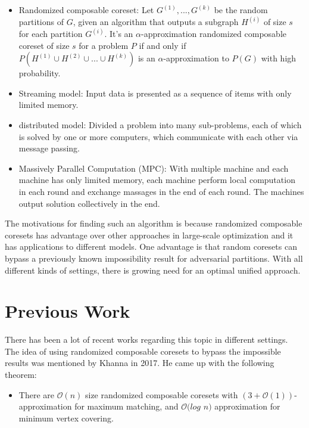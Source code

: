 \documentclass[12pt]{report}
\begin{document}
{\begin{itemize}
    \item Randomized composable coreset: Let $G^{(1)} ,...,G^{(k)}$ be the random partitions of $G$, given an algorithm that outputs a subgraph $H^{(i)}$ of size $s$ for each partition $G^{(i)}$. It's an $\alpha$-approximation randomized composable coreset of size $s$ for a problem $P$ if and only if $P(H^{(1)} \cup H^{(2)} \cup ... \cup H^{(k)} )$ is an $\alpha$-approximation to $P(G)$ with high probability.
    \item Streaming model: Input data is presented as a sequence of items with only limited memory.
    \item distributed model: Divided a problem into many sub-problems, each of which is solved by one or more computers, which communicate with each other via message passing.
    
    \newpage 
    
    \item Massively Parallel Computation (MPC): With multiple machine and each machine has only limited memory, each machine perform local computation in each round and exchange massages in the end of each round. The machines output solution collectively in the end. 
\end{itemize}

The motivations for finding such an algorithm is because randomized composable coresets has advantage over other approaches in large-scale optimization and it has applications to different models. One advantage is that random coresets can bypass a previously known impossibility result for adversarial partitions. With all different kinds of settings, there is growing need for an optimal unified approach. 
\\

\section{Previous Work}
There has been a lot of recent works regarding this topic in different settings.\\

The idea of using randomized composable coresets
to bypass the impossible results was mentioned by Khanna in 2017. He came up with the following theorem: 

\begin{itemize}
    \item There are $\mathcal{O}(n)$ size randomized composable
    coresets with $(3 + \mathcal{O}(1))$- approximation for maximum matching, and $\mathcal{O}(log$ $n)$ approximation for minimum vertex covering.
    \\
\end{itemize}

}
\end{document}
